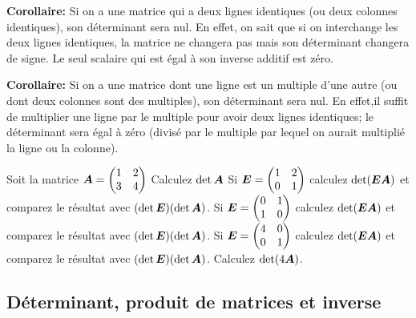 \textbf{Corollaire:} Si on a une matrice qui a deux lignes identiques (ou deux colonnes identiques), son déterminant sera nul.  En effet, on sait que si on interchange les deux
lignes identiques, la matrice ne changera pas mais son déterminant changera de signe.
Le seul scalaire qui est égal à son inverse additif est zéro.

\textbf{Corollaire:} Si on a une matrice dont une ligne est un multiple d'une autre
 (ou dont deux colonnes sont des multiples), son déterminant sera nul.  En effet,il suffit
 de multiplier une ligne par le multiple pour avoir deux lignes identiques; le déterminant
 sera égal à zéro (divisé par le multiple par lequel on aurait multiplié la ligne ou 
 la colonne).


\begin{exerciceC}
Soit la matrice $\boldsymbol{A} = \displaystyle \begin{pmatrix}
1 & 2 \\ 3 & 4
\end{pmatrix}$
 Calculez $\det{\boldsymbol{A}}$
 Si $\boldsymbol{E} = \displaystyle \begin{pmatrix}
1 & 2 \\ 0 & 1
\end{pmatrix}$
calculez $\det (\boldsymbol{E}\boldsymbol{A})$ et comparez le résultat avec $(\det \boldsymbol{E})( \det\boldsymbol{A})$.
 Si $\boldsymbol{E} = \displaystyle \begin{pmatrix}
0 & 1 \\ 1 & 0
\end{pmatrix}$
calculez $\det (\boldsymbol{E}\boldsymbol{A})$ et comparez le résultat avec $(\det \boldsymbol{E})( \det\boldsymbol{A})$.
 Si $\boldsymbol{E} = \displaystyle \begin{pmatrix}
4 & 0 \\ 0 & 1
\end{pmatrix}$
calculez $\det (\boldsymbol{E}\boldsymbol{A})$ et comparez le résultat avec $(\det \boldsymbol{E})( \det\boldsymbol{A})$.
 Calculez $\det (4\boldsymbol{A})$.
\end{exerciceC}

\subsection{Déterminant, produit de matrices et inverse}

